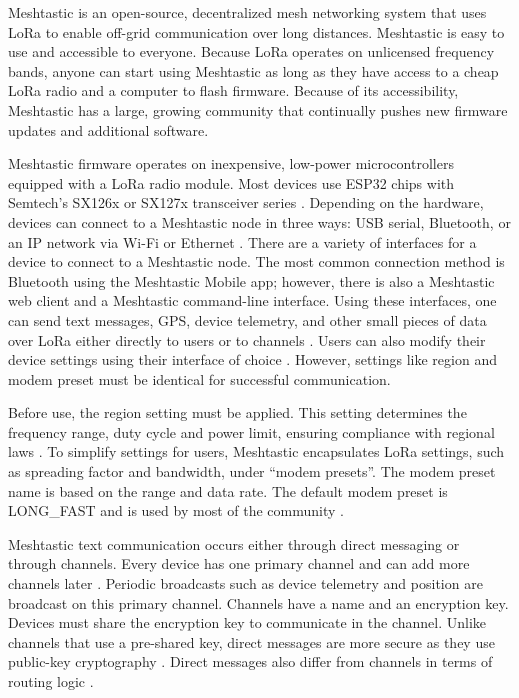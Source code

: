 \documentclass[11pt]{article}
\begin{document}
Meshtastic is an open-source, decentralized mesh networking system that uses LoRa to enable off-grid communication over long distances. Meshtastic is easy to use and accessible to everyone. Because LoRa operates on unlicensed frequency bands, anyone can start using Meshtastic as long as they have access to a cheap LoRa radio and a computer to flash firmware. Because of its accessibility, Meshtastic has a large, growing community that continually pushes new firmware updates and additional software.

Meshtastic firmware operates on inexpensive, low-power microcontrollers equipped with a LoRa radio module. Most devices use ESP32 chips with Semtech’s SX126x or SX127x transceiver series \cite{smartnmagic_meshtastic_nodate}. Depending on the hardware, devices can connect to a Meshtastic node in three ways: USB serial, Bluetooth, or an IP network via Wi-Fi or Ethernet \cite{meshtastic_overview_nodate}. There are a variety of interfaces for a device to connect to a Meshtastic node. The most common connection method is Bluetooth using the Meshtastic Mobile app; however, there is also a Meshtastic web client and a Meshtastic command-line interface. Using these interfaces, one can send text messages, GPS, device telemetry, and other small pieces of data over LoRa either directly to users or to channels \cite{meshtastic_portnum_nodate}. Users can also modify their device settings using their interface of choice \cite{meshtastic_webflasher_nodate}. However, settings like region and modem preset must be identical for successful communication.

Before use, the region setting must be applied. This setting determines the frequency range, duty cycle and power limit, ensuring compliance with regional laws \cite{meshtastic_initial_nodate}. To simplify settings for users, Meshtastic encapsulates LoRa settings, such as spreading factor and bandwidth, under “modem presets”. The modem preset name is based on the range and data rate. The default modem preset is LONG\_FAST and is used by most of the community \cite{meshtastic_radio_nodate}. 

Meshtastic text communication occurs either through direct messaging or through channels. Every device has one primary channel and can add more channels later \cite{meshtastic_channel_nodate}. Periodic broadcasts such as device telemetry and position are broadcast on this primary channel. Channels have a name and an encryption key. Devices must share the encryption key to communicate in the channel. Unlike channels that use a pre-shared key, direct messages are more secure as they use public-key cryptography \cite{meshtastic_encryption_nodate}. Direct messages also differ from channels in terms of routing logic \cite{meshtastic_mesh_algorithm}.
\end{document}

